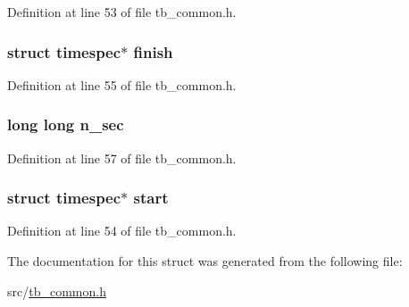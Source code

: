 Definition at line 53 of file tb\-\_\-common.\-h.

\hypertarget{structtb__time__t_a48fdbc276d8f5d2f81ebe02d2ff62473}{
\subsubsection[{finish}]{\setlength{\rightskip}{0pt plus 5cm}struct timespec$\ast$ finish}}\label{structtb__time__t_a48fdbc276d8f5d2f81ebe02d2ff62473}


Definition at line 55 of file tb\-\_\-common.\-h.

\hypertarget{structtb__time__t_a8889de00f0d94d229d5549cd57597948}{
\subsubsection[{n\-\_\-sec}]{\setlength{\rightskip}{0pt plus 5cm}long long n\-\_\-sec}}\label{structtb__time__t_a8889de00f0d94d229d5549cd57597948}


Definition at line 57 of file tb\-\_\-common.\-h.

\hypertarget{structtb__time__t_a300f258f56b552b672396bfbede700a8}{
\subsubsection[{start}]{\setlength{\rightskip}{0pt plus 5cm}struct timespec$\ast$ start}}\label{structtb__time__t_a300f258f56b552b672396bfbede700a8}


Definition at line 54 of file tb\-\_\-common.\-h.



The documentation for this struct was generated from the following file\-:\begin{DoxyCompactItemize}
\item 
src/\hyperlink{tb__common_8h}{tb\-\_\-common.\-h}\end{DoxyCompactItemize}
